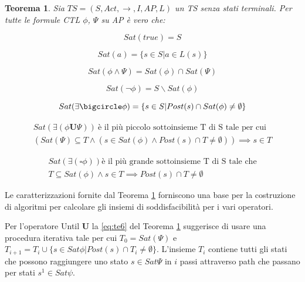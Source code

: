 \documentclass[a4paper, 10pt]{article}
\newtheorem{theor}{Teorema}[section]
\numberwithin{equation}{theor}
\begin{document}
\begin{theor}
\label{eq:teoremaCaratterizzazione}
Sia $TS = (S, Act, \rightarrow, I, AP, L)$ un \ac{TS} senza stati terminali. Per tutte le formule \ac{CTL} $\phi$, $\Psi$ su AP è vero che:

\begin{equation}\label{eq:te1}
Sat(true) = S
\end{equation}

\begin{equation}\label{eq:te2}
Sat(a) = \{s \in S | a \in L(s)\}
\end{equation}

\begin{equation}\label{eq:te3}
Sat( \phi \wedge \Psi) = Sat(\phi)  \cap Sat(\Psi)
\end{equation}

\begin{equation}\label{eq:te4}
Sat(\neg \phi) = S \backslash Sat(\phi)
\end{equation}

\begin{equation}\label{eq:te5}
Sat(\exists\bigcircle\phi) = \{s \in S | Post(s) \cap Sat(\phi) \neq \emptyset\}
\end{equation}

\begin{equation}\label{eq:te6}
\begin{aligned}
Sat(\exists(\phi \boldsymbol{U} \Psi))\ \text{è il più piccolo sottoinsieme T di S tale per cui } \\
(Sat(\Psi) \subseteq T \wedge (s \in Sat(\phi) \wedge Post(s) \cap T \neq \emptyset)) \implies s \in T
\end{aligned}
\end{equation}

\begin{equation}\label{eq:te7}
\begin{aligned}
Sat(\exists(\square\phi)) \text{è il più grande sottoinsieme T di S tale che} \\
T \subseteq Sat (\phi) \wedge s \in T \implies Post(s) \cap T \neq \emptyset
\end{aligned}
\end{equation}
\end{theor}



Le caratterizzazioni fornite dal Teorema \ref{eq:teoremaCaratterizzazione} forniscono una base per la costruzione di algoritmi per calcolare gli insiemi di soddisfacibilità per i vari operatori. \par
Per l'operatore Until $\boldsymbol{U}$ la \eqref{eq:te6} del Teorema \ref{eq:teoremaCaratterizzazione} suggerisce di usare una procedura iterativa tale per cui $T_{0} = Sat(\Psi)$ e $T_{i+1} = T_{i} \cup \{s \in Sat{\phi} | Post(s) \cap T_{i} \neq \emptyset \}$. L'insieme $T_{i}$ contiene tutti gli stati che possono raggiungere uno stato $s \in Sat{\Psi}$ in $i$ passi attraverso path che passano per stati $s^{1} \in Sat{\psi}$.
\end{document}

